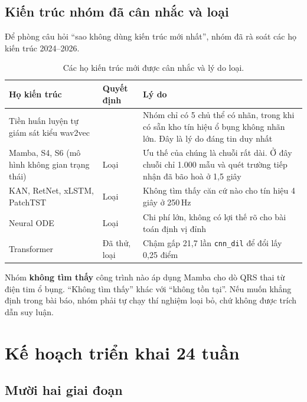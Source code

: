 \subsection{Kiến trúc nhóm đã cân nhắc và loại}

Để phòng câu hỏi ``sao không dùng kiến trúc mới nhất'', nhóm đã rà soát các họ kiến trúc 2024--2026.

\begin{table}[H]\centering\small
\caption{Các họ kiến trúc mới được cân nhắc và lý do loại.}
\label{tab:loai}
\begin{tabular}{@{}L{4.2cm} C{2.0cm} L{8.0cm}@{}}
\toprule
\textbf{Họ kiến trúc} & \textbf{Quyết định} & \textbf{Lý do} \\
\midrule
Tiền huấn luyện tự giám sát kiểu wav2vec &  & Nhóm chỉ có 5 chủ thể có nhãn, trong khi có
sẵn kho tín hiệu ổ bụng không nhãn lớn. Đây là lý do đáng tin duy nhất \\
Mamba, S4, S6 (mô hình không gian trạng thái) & Loại & Ưu thế của chúng là chuỗi rất dài. Ở đây chuỗi chỉ
1.000 mẫu và quét trường tiếp nhận đã bão hoà ở 1,5 giây \\
KAN, RetNet, xLSTM, PatchTST & Loại & Không tìm thấy căn cứ nào cho tín hiệu 4 giây ở 250\,Hz \\
Neural ODE & Loại & Chi phí lớn, không có lợi thế rõ cho bài toán định vị đỉnh \\
Transformer & Đã thử, loại & Chậm gấp 21,7 lần \texttt{cnn\_dil} để đổi lấy 0,25 điểm \\
\bottomrule
\end{tabular}
\end{table}

\begin{canhbao}[title={Ranh giới của khẳng định trên}]
Nhóm \textbf{không tìm thấy} công trình nào áp dụng Mamba cho dò QRS thai từ điện tim ổ bụng.
``Không tìm thấy'' khác với ``không tồn tại''. Nếu muốn khẳng định trong bài báo, nhóm phải tự chạy
thí nghiệm loại bỏ, chứ không được trích dẫn suy luận.
\end{canhbao}

\clearpage

\section{Kế hoạch triển khai 24 tuần}

\subsection{Mười hai giai đoạn}

